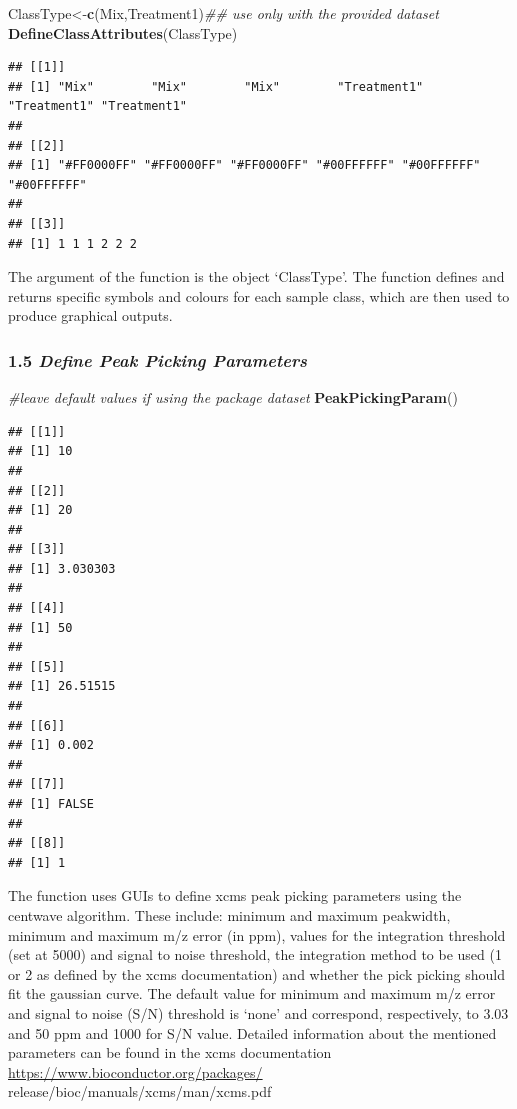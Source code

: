 \documentclass[
]{article}
\newenvironment{Shaded}{\begin{snugshade}}{\end{snugshade}}
\newcommand{\CommentTok}[1]{\textcolor[rgb]{0.56,0.35,0.01}{\textit{#1}}}
\newcommand{\KeywordTok}[1]{\textcolor[rgb]{0.13,0.29,0.53}{\textbf{#1}}}
\newcommand{\NormalTok}[1]{#1}
\newcommand{\StringTok}[1]{\textcolor[rgb]{0.31,0.60,0.02}{#1}}
\begin{document}
\begin{Shaded}
\begin{Highlighting}[]
\NormalTok{ClassType<{-}}\KeywordTok{c}\NormalTok{(}\StringTok{\textquotesingle{}Mix\textquotesingle{}}\NormalTok{,}\StringTok{\textquotesingle{}Treatment1\textquotesingle{}}\NormalTok{)}\CommentTok{\#\# use only with the provided dataset}
\KeywordTok{DefineClassAttributes}\NormalTok{(ClassType)}
\end{Highlighting}
\end{Shaded}

\begin{verbatim}
## [[1]]
## [1] "Mix"        "Mix"        "Mix"        "Treatment1" "Treatment1" "Treatment1"
## 
## [[2]]
## [1] "#FF0000FF" "#FF0000FF" "#FF0000FF" "#00FFFFFF" "#00FFFFFF" "#00FFFFFF"
## 
## [[3]]
## [1] 1 1 1 2 2 2
\end{verbatim}

The argument of the function is the object `ClassType'. The function
defines and returns specific symbols and colours for each sample class,
which are then used to produce graphical outputs.

\hypertarget{define-peak-picking-parameters}{%
\subsubsection{\texorpdfstring{1.5 \emph{Define Peak Picking
Parameters}}{1.5 Define Peak Picking Parameters}}\label{define-peak-picking-parameters}}

\begin{Shaded}
\begin{Highlighting}[]
\CommentTok{\#leave default values if using the package dataset}
\KeywordTok{PeakPickingParam}\NormalTok{()}
\end{Highlighting}
\end{Shaded}

\begin{verbatim}
## [[1]]
## [1] 10
## 
## [[2]]
## [1] 20
## 
## [[3]]
## [1] 3.030303
## 
## [[4]]
## [1] 50
## 
## [[5]]
## [1] 26.51515
## 
## [[6]]
## [1] 0.002
## 
## [[7]]
## [1] FALSE
## 
## [[8]]
## [1] 1
\end{verbatim}

The function uses GUIs to define xcms peak picking parameters using the
centwave algorithm. These include: minimum and maximum peakwidth,
minimum and maximum m/z error (in ppm), values for the integration
threshold (set at 5000) and signal to noise threshold, the integration
method to be used (1 or 2 as defined by the xcms documentation) and
whether the pick picking should fit the gaussian curve. The default
value for minimum and maximum m/z error and signal to noise (S/N)
threshold is `none' and correspond, respectively, to 3.03 and 50 ppm and
1000 for S/N value. Detailed information about the mentioned parameters
can be found in the xcms documentation
\url{https://www.bioconductor.org/packages/}
release/bioc/manuals/xcms/man/xcms.pdf
\end{document}
